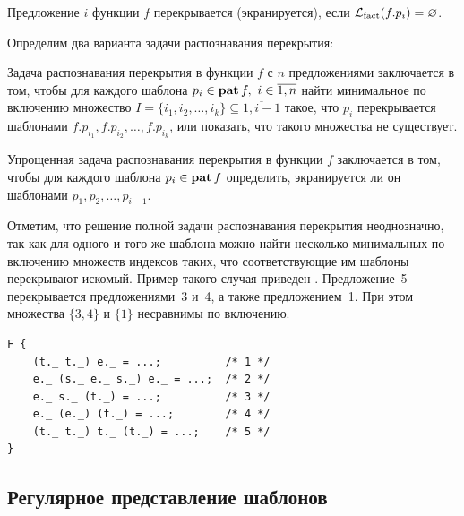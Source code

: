\begin{Definition}[Перекрытие]
Предложение $i$ функции $f$ перекрывается (экранируется), если $\mathcal{L}_{\text{fact}}(f.p_i) = \varnothing$.
\end{Definition}

Определим два варианта задачи распознавания перекрытия:
\begin{Definition}
Задача распознавания перекрытия в функции $f$ с $n$ предложениями 
заключается в том, чтобы для каждого шаблона $p_i \in \operatorname{\textbf{pat}} f,\ i \in \overline{1,n}$ 
найти минимальное по включению множество 
$I = \{i_1, i_2, \ldots, i_k\} \subseteq \overline{1,i-1}$ такое, что 
$p_i$ перекрывается шаблонами $f.p_{i_1}, f.p_{i_2}, \ldots, f.p_{i_k}$, 
или показать, что такого множества не существует.
\end{Definition}

\begin{Definition}
  Упрощенная задача распознавания перекрытия в функции $f$
  заключается в том, чтобы для каждого шаблона $p_i \in \operatorname{\textbf{pat}} f$ определить, 
  экранируется ли он шаблонами $p_1, p_2, \ldots, p_{i-1}$.
\end{Definition}

Отметим, что решение полной задачи распознавания перекрытия неоднозначно, так 
как для одного и того же шаблона можно найти несколько минимальных по 
включению множеств индексов таких, что соответствующие им шаблоны 
перекрывают искомый. Пример такого случая приведен .
Предложение~5 перекрывается предложениями~3 и~4, а также предложением~1. 
При этом множества $\{3, 4\}$ и $\{1\}$ несравнимы по включению.

\begin{listing}[H]
\caption{Пример неоднозначного экранирования предложений Рефал-функции}
\label{lst:ambiguous-overlapping}
\begin{verbatim}
F {
    (t._ t._) e._ = ...;          /* 1 */
    e._ (s._ e._ s._) e._ = ...;  /* 2 */
    e._ s._ (t._) = ...;          /* 3 */
    e._ (e._) (t._) = ...;        /* 4 */
    (t._ t._) t._ (t._) = ...;    /* 5 */
}
\end{verbatim}
\end{listing}

\subsection{Регулярное представление шаблонов} %

